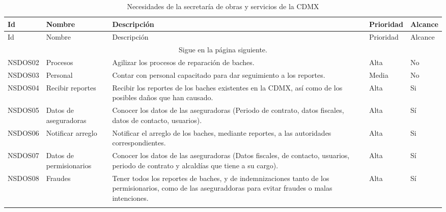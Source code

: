 \begin{longtable}{|m{1.5cm}|m{3cm}|m{5cm}|m{2cm}| m{2cm}|}\rowcolor[HTML]{3531FF} 
        {\color[HTML]{FFFFFF} Id} &{\color[HTML]{FFFFFF}Nombre} & {\color[HTML]{FFFFFF} Descripción} & {\color[HTML]{FFFFFF}Prioridad} & {\color[HTML]{FFFFFF}Alcance}\\
        \hline
        \endfirsthead
        \hline
        \rowcolor[HTML]{3531FF} 
        {\color[HTML]{FFFFFF} Id} &{\color[HTML]{FFFFFF}Nombre} & {\color[HTML]{FFFFFF} Descripción} & {\color[HTML]{FFFFFF}Prioridad} & {\color[HTML]{FFFFFF}Alcance}\\
        \hline 
        \endhead
        \multicolumn{5}{c}{Sigue en la página siguiente.}
        \endfoot
        \endlastfoot
        NSDOS01 & Herramienta de reportes & Contar con una herramienta óptima para la recepción y seguimiento de los reportes de los baches en la CDMX. & Alta & Si \\
        \hline
        
        NSDOS02 & Procesos & Agilizar los procesos de reparación de baches. & Alta & No \\
        \hline
        
        NSDOS03 & Personal & Contar con personal capacitado para dar seguimiento a los reportes. & Media & No\\ 
        \hline
        
        NSDOS04 & Recibir reportes & Recibir los reportes de los baches existentes en la CDMX, así como de los posibles daños que han causado.  & Alta & Si\\
        \hline
        
        NSDOS05 & Datos de aseguradoras & Conocer los datos de las aseguradoras (Periodo de contrato, datos fiscales, datos de contacto, usuarios). & Alta & Sí \\
        \hline
        
        NSDOS06 & Notificar arreglo & Notificar el arreglo de los baches, mediante reportes, a las autoridades correspondientes. & Alta & Si\\
        \hline
        
        NSDOS07 & Datos de permisionarios & Conocer los datos de las aseguradoras (Datos fiscales, de contacto, usuarios, periodo de contrato y alcaldías que tiene a su cargo). & Alta & Sí \\
        \hline
        
        NSDOS08 & Fraudes & Tener todos los reportes de baches, y de indemnizaciones tanto de los permisionarios, como de las aseguraddoras para evitar fraudes o malas intenciones. & Alta & Sí \\ \hline
        
    \caption{Necesidades de la secretaría de obras y servicios de la CDMX}
    \label{tab:NPDS}
\end{longtable}


